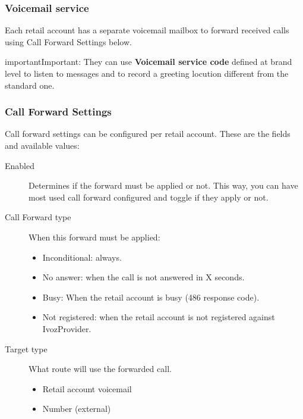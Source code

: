 \documentclass[letterpaper,10pt,english]{sphinxmanual}
\begin{document}
\subsubsection{Voicemail service}
\label{retail/retail_accounts:voicemail-service}
Each retail account has a separate voicemail mailbox to forward received calls using Call Forward Settings below.

\begin{notice}{important}{Important:}
They can use \textbf{Voicemail service code} defined at brand level to listen to messages and to
record a greeting locution different from the standard one.
\end{notice}


\subsubsection{Call Forward Settings}
\label{retail/retail_accounts:call-forward-settings}
Call forward settings can be configured per retail account. These are the fields and available values:
\begin{description}
\item[{Enabled}] \leavevmode{}\label{retail/retail_accounts:term-enabled}
Determines if the forward must be applied or not. This way, you can have
most used call forward configured and toggle if they apply or not.

\item[{Call Forward type}] \leavevmode{}\label{retail/retail_accounts:term-call-forward-type}
When this forward must be applied:
\begin{itemize}
\item {} 
Inconditional: always.

\item {} 
No answer: when the call is not answered in X seconds.

\item {} 
Busy: When the retail account is busy (486 response code).

\item {} 
Not registered: when the retail account is not registered
against IvozProvider.

\end{itemize}

\item[{Target type}] \leavevmode{}\label{retail/retail_accounts:term-target-type}
What route will use the forwarded call.
\begin{itemize}
\item {} 
Retail account voicemail

\item {} 
Number (external)

\end{itemize}

\end{description}
\end{document}
